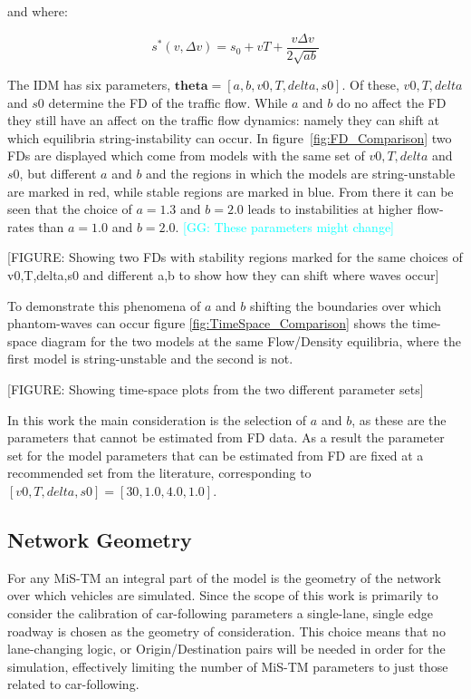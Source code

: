\documentclass[english,titlepage,oneside,12pt]{article}
\newcommand{\kibitz}[2]{\ifnum\Comments=0\textcolor{#1}{#2}\fi}
\newcommand{\George}[1]{\kibitz{cyan}      {[GG: #1]}}
\begin{document}
and where:

\begin{equation}\label{eq:IDM_Spacing_Equation}
    s^{*}\left(v,\Delta v\right)=s_{0}+vT+\frac{v\Delta v}{2\sqrt{ab}}
\end{equation}

The IDM has six parameters, $\boldsymbol{theta} = [a,b,v0,T,delta,s0]$. Of these, $v0,T,delta$ and $s0$ determine the FD of the traffic flow. While $a$ and $b$ do no affect the FD they still have an affect on the traffic flow dynamics: namely they can shift at which equilibria string-instability can occur. In figure~\ref{fig:FD_Comparison} two FDs are displayed which come from models with the same set of $v0,T,delta$ and $s0$, but different $a$ and $b$ and the regions in which the models are string-unstable are marked in red, while stable regions are marked in blue. From there it can be seen that the choice of $a=1.3$ and $b=2.0$ leads to instabilities at higher flow-rates than $a=1.0$ and $b=2.0$. \George{These parameters might change}

[FIGURE: Showing two FDs with stability regions marked for the same choices of v0,T,delta,s0 and different a,b to show how they can shift where waves occur] 

To demonstrate this phenomena of $a$ and $b$ shifting the boundaries over which phantom-waves can occur figure \ref{fig:TimeSpace_Comparison} shows the time-space diagram for the two models at the same Flow/Density equilibria, where the first model is string-unstable and the second is not.

[FIGURE: Showing time-space plots from the two different parameter sets]

In this work the main consideration is the selection of $a$ and $b$, as these are the parameters that cannot be estimated from FD data. As a result the parameter set for the model parameters that can be estimated from FD are fixed at a recommended set from the literature, corresponding to $[v0,T,delta,s0]=[30,1.0,4.0,1.0]$.

\subsection{Network Geometry}
For any MiS-TM an integral part of the model is the geometry of the network over which vehicles are simulated. Since the scope of this work is primarily to consider the calibration of car-following parameters a single-lane, single edge roadway is chosen as the geometry of consideration. This choice means that no lane-changing logic, or Origin/Destination pairs will be needed in order for the simulation, effectively limiting the number of MiS-TM parameters to just those related to car-following. 
\end{document}
